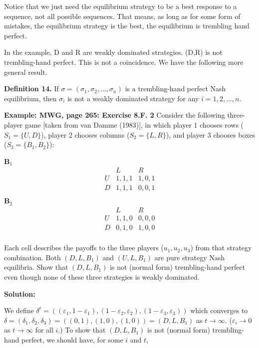 \documentclass[12pt, oneside]{article}
\begin{document}
Notice that we just need the equilibrium strategy to be a best response to a sequence, not all possible sequences. That means, as long as for some form of mistakes, the equilibrium strategy is the best, the equilibrium is trembling hand perfect.

In the example, D and R are weakly dominated strategies. (D,R) is not trembling-hand perfect. This is not a coincidence. We have the following more general result.

\textbf{Definition 14.} If $\sigma = (\sigma_1, \sigma_2, \dots, \sigma_n)$ is a trembling-hand perfect Nash equilibrium, then $\sigma_i$ is not a weakly dominated strategy for any $i = 1,2, \dots, n$.

\textbf{Example: MWG, page 265: Exercise 8.F. 2}
Consider the following three-player game [taken from van Damme (1983)], in which player 1 chooses rows ($S_1 = \{U,D\}$), player 2 chooses columns ($S_2 = \{L,R\}$), and player 3 chooses boxes ($S_3 = \{B_1,B_2\}$):

\begin{center}
\textbf{B$_1$}
\[
\begin{array}{c|cc}
    & L & R  \\
\hline
U & 1,1,1 & 1,0,1 \\
D & 1,1,1 & 0,0,1 \\
\end{array}
\]
\hspace{1cm}
\textbf{B$_2$}
\[
\begin{array}{c|cc}
    & L & R  \\
\hline
U & 1,1,0 & 0,0,0 \\
D & 0,1,0 & 1,0,0 \\
\end{array}
\]
\end{center}

Each cell describes the payoffs to the three players ($u_1, u_2, u_3$) from that strategy combination. Both $(D,L,B_1)$ and $(U,L,B_1)$ are pure strategy Nash equilibria. Show that $(D,L,B_1)$ is not (normal form) trembling-hand perfect even though none of these three strategies is weakly dominated.

\textbf{Solution:}

We define $\delta^t = ((\varepsilon_1, 1 - \varepsilon_1), (1 - \varepsilon_2, \varepsilon_2), (1 - \varepsilon_3, \varepsilon_3))$ which converges to $\delta = (\delta_1, \delta_2, \delta_3) = ((0,1), (1,0), (1,0)) = (D, L, B_1)$ as $t \to \infty$. ($\varepsilon_i \to 0$ as $t \to \infty$ for all $i$.) To show that $(D,L,B_1)$ is not (normal form) trembling-hand perfect, we should have, for some $i$ and $t$,
\end{document}
